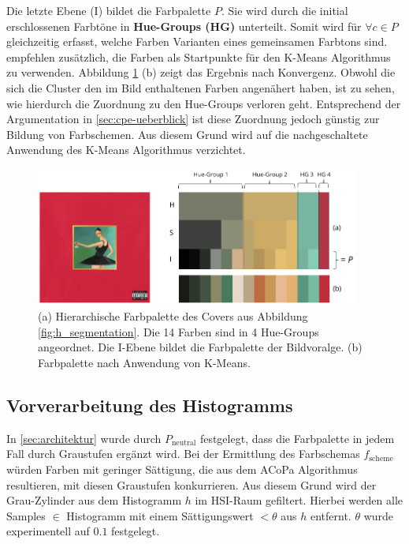 Die letzte Ebene (I) bildet die Farbpalette $P$. Sie wird durch die initial erschlossenen Farbtöne in \textbf{Hue-Groups (HG)} unterteilt. Somit wird für $\forall c \in P$ gleichzeitig erfasst, welche Farben Varianten eines gemeinsamen Farbtons sind. \citet{acopa} empfehlen zusätzlich, die Farben als Startpunkte für den K-Means Algorithmus zu verwenden. Abbildung \ref{fig:palette} (b) zeigt das Ergebnis nach Konvergenz. Obwohl die sich die Cluster den im Bild enthaltenen Farben angenähert haben, ist zu sehen, wie hierdurch die Zuordnung zu den Hue-Groups verloren geht. Entsprechend der Argumentation in \autoref{sec:cpe-ueberblick} ist diese Zuordnung jedoch günstig zur Bildung von Farbschemen. Aus diesem Grund wird auf die nachgeschaltete Anwendung des K-Means Algorithmus verzichtet.

\begin{figure}[]
\centering
\includegraphics[width=0.95\textwidth]{img/palette.png}
\caption{(a) Hierarchische Farbpalette des Covers aus Abbildung \ref{fig:h_segmentation}. Die 14 Farben sind in 4 Hue-Groups angeordnet. Die I-Ebene bildet die Farbpalette der Bildvoralge. (b) Farbpalette nach Anwendung von K-Means.}
\label{fig:palette}
\end{figure}

\subsection{Vorverarbeitung des Histogramms}
\label{sec:vorverarbeitung}

In \autoref{sec:architektur} wurde durch $P_\text{neutral}$ festgelegt, dass die Farbpalette in jedem Fall durch Graustufen ergänzt wird. Bei der Ermittlung des Farbschemas $f_\text{scheme}$ würden Farben mit geringer Sättigung, die aus dem ACoPa Algorithmus resultieren, mit diesen Graustufen konkurrieren. Aus diesem Grund wird der \glqq{}Grau-Zylinder\grqq{} \citep{acopa} aus dem Histogramm $h$ im HSI-Raum gefiltert. Hierbei werden alle Samples $\in$ Histogramm mit einem Sättigungswert $< \theta$ aus $h$ entfernt. $\theta$ wurde experimentell auf $0.1$ festgelegt.

